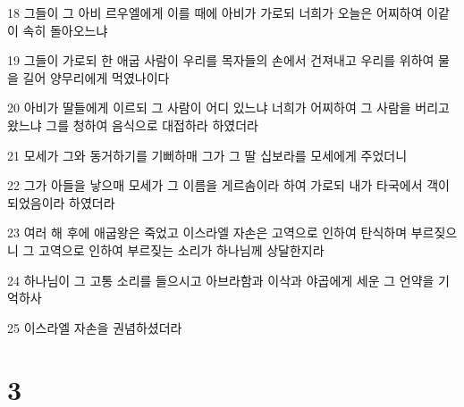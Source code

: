 \par 18 그들이 그 아비 르우엘에게 이를 때에 아비가 가로되 너희가 오늘은 어찌하여 이같이 속히 돌아오느냐
\par 19 그들이 가로되 한 애굽 사람이 우리를 목자들의 손에서 건져내고 우리를 위하여 물을 길어 양무리에게 먹였나이다
\par 20 아비가 딸들에게 이르되 그 사람이 어디 있느냐 너희가 어찌하여 그 사람을 버리고 왔느냐 그를 청하여 음식으로 대접하라 하였더라
\par 21 모세가 그와 동거하기를 기뻐하매 그가 그 딸 십보라를 모세에게 주었더니
\par 22 그가 아들을 낳으매 모세가 그 이름을 게르솜이라 하여 가로되 내가 타국에서 객이 되었음이라 하였더라
\par 23 여러 해 후에 애굽왕은 죽었고 이스라엘 자손은 고역으로 인하여 탄식하며 부르짖으니 그 고역으로 인하여 부르짖는 소리가 하나님께 상달한지라
\par 24 하나님이 그 고통 소리를 들으시고 아브라함과 이삭과 야곱에게 세운 그 언약을 기억하사
\par 25 이스라엘 자손을 권념하셨더라

\chapter{3}

